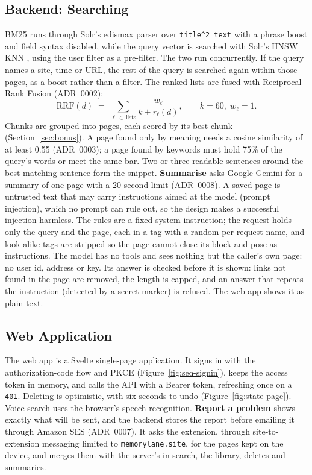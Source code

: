 \subsection{Backend: Searching}

BM25 \cite{robertson2009bm25} runs through Solr's edismax parser over
\texttt{title\^{}2 text} with a phrase boost and field syntax disabled, while
the query vector is searched with Solr's HNSW KNN \cite{solr}, using the user
filter as a pre-filter. The two run concurrently. If the query names a site,
time or URL, the rest of the query is searched again within those pages, as a
boost rather than a filter. The ranked lists are fused with Reciprocal Rank
Fusion \cite{cormack2009rrf} (ADR~0002):
\[
\mathrm{RRF}(d) \;=\; \sum_{\ell \,\in\, \text{lists}} \frac{w_\ell}{k + r_\ell(d)},
\qquad k = 60,\; w_\ell = 1 .
\]
Chunks are grouped into pages, each scored by its best chunk
(Section~\ref{sec:bonus}). A page found only by meaning needs a cosine
similarity of at least 0.55 (ADR~0003); a page found by keywords must hold
75\% of the query's words or meet the same bar. Two or three readable
sentences around the best-matching sentence form the snippet.
\textbf{Summarise} asks Google Gemini \cite{gemini} for a summary of one page
with a 20-second limit (ADR~0008). A saved page is untrusted text that may
carry instructions aimed at the model (prompt injection), which no prompt can
rule out, so the design makes a successful injection harmless. The rules are a
fixed system instruction; the request holds only the query and the page, each
in a tag with a random per-request name, and look-alike tags are stripped so
the page cannot close its block and pose as instructions. The model has no
tools and sees nothing but the caller's own page: no user id, address or key.
Its answer is checked before it is shown: links not found in the page are
removed, the length is capped, and an answer that repeats the instruction
(detected by a secret marker) is refused. The web app shows it as plain text.

\subsection{Web Application}

The web app is a Svelte \cite{svelte} single-page application. It signs in
with the authorization-code flow and PKCE (Figure~\ref{fig:seq-signin}), keeps
the access token in memory, and calls the API with a Bearer token, refreshing
once on a \texttt{401}. Deleting is optimistic, with six seconds to undo
(Figure~\ref{fig:state-page}). Voice search uses the browser's speech
recognition. \textbf{Report a problem} shows exactly what will be sent, and the
backend stores the report before emailing it through Amazon SES (ADR~0007).
It asks the extension, through site-to-extension messaging limited to
\texttt{memorylane.site}, for the pages kept on the device, and merges them
with the server's in search, the library, deletes and summaries.

